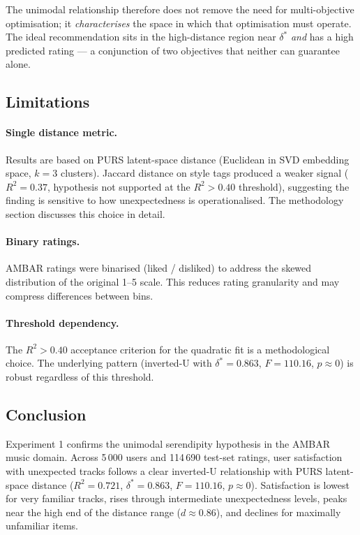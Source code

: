 \noindent
The unimodal relationship therefore does not remove the need for
multi-objective optimisation; it \emph{characterises} the space in which that
optimisation must operate.  The ideal recommendation sits in the high-distance
region near $\delta^*$ \emph{and} has a high predicted rating --- a conjunction
of two objectives that neither can guarantee alone.

\subsection{Limitations}

\paragraph{Single distance metric.}
Results are based on PURS latent-space distance (Euclidean in SVD embedding
space, $k = 3$ clusters).  Jaccard distance on style tags produced a weaker
signal ($R^2 = 0.37$, hypothesis not supported at the $R^2 > 0.40$ threshold),
suggesting the finding is sensitive to how unexpectedness is operationalised.
The methodology section discusses this choice in detail.

\paragraph{Binary ratings.}
AMBAR ratings were binarised (liked / disliked) to address the skewed
distribution of the original 1--5 scale.  This reduces rating granularity and
may compress differences between bins.

\paragraph{Threshold dependency.}
The $R^2 > 0.40$ acceptance criterion for the quadratic fit is a
methodological choice.  The underlying pattern (inverted-U with $\delta^* =
0.863$, $F = 110.16$, $p \approx 0$) is robust regardless of this threshold.

\subsection{Conclusion}

Experiment 1 confirms the unimodal serendipity hypothesis in the AMBAR music
domain.  Across 5\,000 users and 114\,690 test-set ratings, user satisfaction
with unexpected tracks follows a clear inverted-U relationship with
PURS latent-space distance ($R^2 = 0.721$, $\delta^* = 0.863$, $F = 110.16$,
$p \approx 0$).  Satisfaction is lowest for very familiar tracks, rises through
intermediate unexpectedness levels, peaks near the high end of the distance
range ($d \approx 0.86$), and declines for maximally unfamiliar items.

